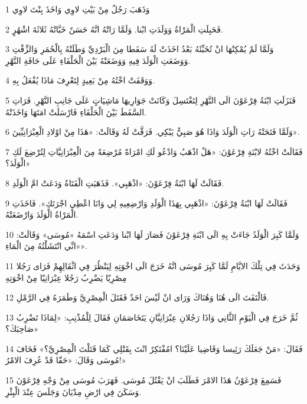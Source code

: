 \par 1 وَذَهَبَ رَجُلٌ مِنْ بَيْتِ لاوِي وَاخَذَ بِنْتَ لاوِي
\par 2 فَحَبِلَتِ الْمَرْاةُ وَوَلَدَتِ ابْنا. وَلَمَّا رَاتْهُ انَّهُ حَسَنٌ خَبَّاتْهُ ثَلاثَةَ اشْهُرٍ.
\par 3 وَلَمَّا لَمْ يُمْكِنْهَا انْ تُخَبِّئَهُ بَعْدُ اخَذَتْ لَهُ سَفَطا مِنَ الْبَرْدِيِّ وَطَلَتْهُ بِالْحُمَرِ وَالزِّفْتِ وَوَضَعَتِ الْوَلَدَ فِيهِ وَوَضَعَتْهُ بَيْنَ الْحَلْفَاءِ عَلَى حَافَةِ النَّهْرِ.
\par 4 وَوَقَفَتْ اخْتُهُ مِنْ بَعِيدٍ لِتَعْرِفَ مَاذَا يُفْعَلُ بِهِ.
\par 5 فَنَزَلَتِ ابْنَةُ فِرْعَوْنَ الَى النَّهْرِ لِتَغْتَسِلَ وَكَانَتْ جَوَارِيهَا مَاشِيَاتٍ عَلَى جَانِبِ النَّهْرِ. فَرَاتِ السَّفَطَ بَيْنَ الْحَلْفَاءِ فَارْسَلَتْ امَتَهَا وَاخَذَتْهُ.
\par 6 وَلَمَّا فَتَحَتْهُ رَاتِ الْوَلَدَ وَاذَا هُوَ صَبِيٌّ يَبْكِي. فَرَقَّتْ لَهُ وَقَالَتْ: «هَذَا مِنْ اوْلادِ الْعِبْرَانِيِّينَ».
\par 7 فَقَالَتْ اخْتُهُ لابْنَةِ فِرْعَوْنَ: «هَلْ اذْهَبُ وَادْعُو لَكِ امْرَاةً مُرْضِعَةً مِنَ الْعِبْرَانِيَّاتِ لِتُرْضِعَ لَكِ الْوَلَدَ؟»
\par 8 فَقَالَتْ لَهَا ابْنَةُ فِرْعَوْنَ: «اذْهَبِي». فَذَهَبَتِ الْفَتَاةُ وَدَعَتْ امَّ الْوَلَدِ.
\par 9 فَقَالَتْ لَهَا ابْنَةُ فِرْعَوْنَ: «اذْهَبِي بِهَذَا الْوَلَدِ وَارْضِعِيهِ لِي وَانَا اعْطِي اجْرَتَكِ». فَاخَذَتِ الْمَرْاةُ الْوَلَدَ وَارْضَعَتْهُ.
\par 10 وَلَمَّا كَبِرَ الْوَلَدُ جَاءَتْ بِهِ الَى ابْنَةِ فِرْعَوْنَ فَصَارَ لَهَا ابْنا وَدَعَتِ اسْمَهُ «مُوسَى» وَقَالَتْ: «انِّي انْتَشَلْتُهُ مِنَ الْمَاءِ».
\par 11 وَحَدَثَ فِي تِلْكَ الايَّامِ لَمَّا كَبِرَ مُوسَى انَّهُ خَرَجَ الَى اخْوَتِهِ لِيَنْظُرَ فِي اثْقَالِهِمْ فَرَاى رَجُلا مِصْرِيّا يَضْرِبُ رَجُلا عِبْرَانِيّا مِنْ اخْوَتِهِ
\par 12 فَالْتَفَتَ الَى هُنَا وَهُنَاكَ وَرَاى انْ لَيْسَ احَدٌ فَقَتَلَ الْمِصْرِيَّ وَطَمَرَهُ فِي الرَّمْلِ.
\par 13 ثُمَّ خَرَجَ فِي الْيَوْمِ الثَّانِي وَاذَا رَجُلانِ عِبْرَانِيَّانِ يَتَخَاصَمَانِ فَقَالَ لِلْمُذْنِبِ: «لِمَاذَا تَضْرِبُ صَاحِبَكَ؟»
\par 14 فَقَالَ: «مَنْ جَعَلَكَ رَئِيسا وَقَاضِيا عَلَيْنَا؟ امُفْتَكِرٌ انْتَ بِقَتْلِي كَمَا قَتَلْتَ الْمِصْرِيَّ؟» فَخَافَ مُوسَى وَقَالَ: «حَقّا قَدْ عُرِفَ الامْرُ!»
\par 15 فَسَمِعَ فِرْعَوْنُ هَذَا الامْرَ فَطَلَبَ انْ يَقْتُلَ مُوسَى. فَهَرَبَ مُوسَى مِنْ وَجْهِ فِرْعَوْنَ وَسَكَنَ فِي ارْضِ مِدْيَانَ وَجَلَسَ عِنْدَ الْبِئْرِ.
